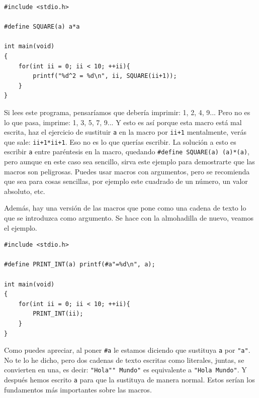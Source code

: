 \documentclass[a4paper]{article}
\begin{document}
\noindent
\begin{minipage}[H]{\linewidth}
\mbox{}
\begin{lstlisting}[style=C,
caption={Ejemplo de error por una macro},
label={lst:macroError}]
#include <stdio.h>

#define SQUARE(a) a*a

int main(void)
{
    for(int ii = 0; ii < 10; ++ii){
        printf("%d^2 = %d\n", ii, SQUARE(ii+1));
    }
}
\end{lstlisting}
\end{minipage}

Si lees este programa, pensaríamos que debería imprimir: 1, 2, 4, 9... Pero
no es lo que pasa, imprime: 1, 3, 5, 7, 9... Y esto es así porque esta macro
está mal escrita, haz el ejercicio de sustituir \verb!a! en la macro por
\verb!ii+1! mentalmente, verás que sale: \verb!ii+1*ii+1!. Eso no es lo que
querías escribir. La solución a esto es escribir \verb!a! entre paréntesis en la
macro, quedando \verb!#define SQUARE(a) (a)*(a)!, pero aunque en este caso sea
sencillo, sirva este ejemplo para demostrarte que las macros son peligrosas.
Puedes usar macros con argumentos, pero se recomienda que sea para cosas
sencillas, por ejemplo este cuadrado de un número, un valor absoluto, etc.

Además, hay una versión de las macros que pone como una cadena de texto
lo que se introduzca como argumento. Se hace con la almohadilla de nuevo,
veamos el ejemplo.

\noindent
\begin{minipage}[H]{\linewidth}
\mbox{}
\begin{lstlisting}[style=C,
caption={Uso de macros con cadenas de texto},
label={lst:macroText}]
#include <stdio.h>

#define PRINT_INT(a) printf(#a"=%d\n", a);

int main(void)
{
    for(int ii = 0; ii < 10; ++ii){
        PRINT_INT(ii);
    }
}
\end{lstlisting}
\end{minipage}

Como puedes apreciar, al poner \verb!#a! le estamos diciendo que sustituya
\verb!a! por \verb!"a"!. No te lo he dicho, pero dos cadenas de texto escritas
como literales, juntas, se convierten en una, es decir: \verb!"Hola"" Mundo"!
es equivalente a \verb!"Hola Mundo"!. Y después hemos escrito \verb!a! para que
la sustituya de manera normal. Estos serían los fundamentos más importantes
sobre las macros.
\end{document}
